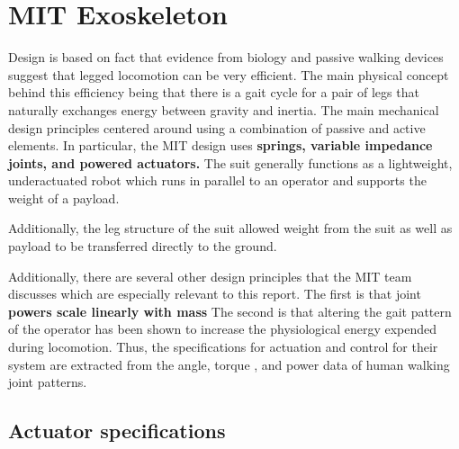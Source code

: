



% 
\section{MIT Exoskeleton}

Design is based  on fact that evidence from biology and passive walking devices suggest that legged locomotion can be very efficient.  The main physical concept behind this efficiency being that there is a gait cycle for a pair of legs that naturally exchanges energy between gravity and inertia.  The main mechanical design principles centered around using a combination of passive and active elements.  In particular, the MIT design uses {\bf springs, variable impedance joints, and powered actuators.}  The suit generally  functions as a lightweight, underactuated robot which runs in parallel to an operator and supports the weight of a payload. 

Additionally, the leg structure of the suit allowed weight from the suit as well as payload to be transferred directly to the ground.

Additionally, there are several other design principles that the MIT team discusses which are especially relevant to this report.  The first is that joint {\bf powers scale linearly with mass}  The second is that altering the gait pattern of the operator has been shown to increase the physiological energy expended during locomotion.  Thus, the specifications for actuation and control for their system are extracted from the angle, torque , and power data of human walking joint patterns.      

\subsection{Actuator specifications}

